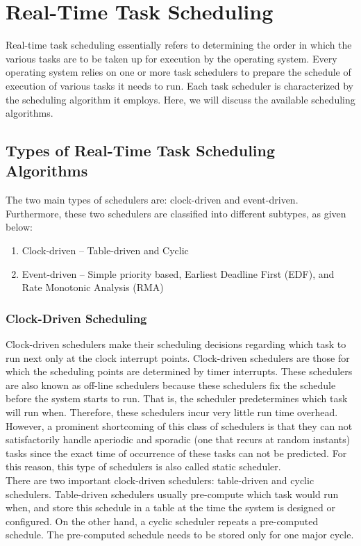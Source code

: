 \documentclass[12pt]{report}
\begin{document}
\chapter{Real-Time Task Scheduling}
Real-time task scheduling essentially refers to determining the order in which the various tasks are to be taken up for execution by the operating system. Every operating system relies on one or more task schedulers to prepare the schedule of execution of various tasks it needs to run. Each task scheduler is characterized by the scheduling algorithm it employs. Here, we will discuss the available scheduling algorithms. 

\section{Types of Real-Time Task Scheduling Algorithms}
The two main types of schedulers are: clock-driven and event-driven. Furthermore, these two schedulers are classified into different subtypes, as given below:
\begin{enumerate}
    \setlength\itemsep{-0.2em}
    \item Clock-driven -- Table-driven and Cyclic
    \item Event-driven -- Simple priority based, Earliest Deadline First (EDF), and Rate Monotonic Analysis (RMA) 
\end{enumerate}

\subsection{Clock-Driven Scheduling}
Clock-driven schedulers make their scheduling decisions regarding which task to run next only at the clock interrupt points. Clock-driven schedulers are those for which the scheduling points are determined by timer interrupts. These schedulers are also known as off-line schedulers because these schedulers fix the schedule before the system starts to run. That is, the scheduler predetermines which task will run when. Therefore, these schedulers incur very little run time overhead. However, a prominent shortcoming of this class of schedulers is that they can not satisfactorily handle aperiodic and sporadic (one that recurs at random instants) tasks since the exact time of occurrence of these tasks can not be predicted. For this reason, this type of schedulers is also called static scheduler.  \\

There are two important clock-driven schedulers: table-driven and cyclic schedulers. Table-driven schedulers usually pre-compute which task would run when, and store this schedule in a table at the time the system is designed or configured. On the other hand, a cyclic scheduler repeats a pre-computed schedule. The pre-computed schedule needs to be stored only for one major cycle. 
\end{document}
